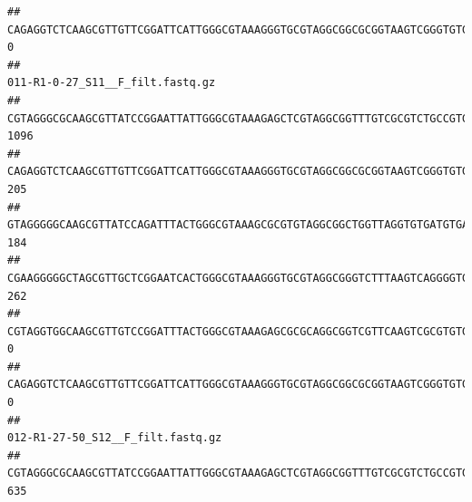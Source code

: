 \documentclass[]{article}
\begin{document}
\begin{verbatim}
## CAGAGGTCTCAAGCGTTGTTCGGATTCATTGGGCGTAAAGGGTGCGTAGGCGGCGCGGTAAGTCGGGTGTGAAATCTCGGGGCTTAACTCCGAAACTGCATTCGATACTGCCGTGCTTGAGGACTGGAGAGGAGACTGGAATTTACGGTGTAGCGGTGAAATGCGTAGATATCGTAAGGAAGACCAGTGGCGAAGGCGGGTCTCTGGACAGTTCCTGACGCTGAGGCACGAAGGCCAGGGGAGCAAACG                                 0
##                                                                                                                                                                                                                                                           011-R1-0-27_S11__F_filt.fastq.gz
## CGTAGGGCGCAAGCGTTATCCGGAATTATTGGGCGTAAAGAGCTCGTAGGCGGTTTGTCGCGTCTGCCGTGAAAGTCCGGGGCTCAACTCCGGATCTGCGGTGGGTACGGGCAGACTAGAGTGATGTAGGGGAGACTGGAATTCCTGGTGTAGCGGTGAAATGCGCAGATATCAGGAGGAACACCGATGGCGAAGGCAGGTCTCTGGGCATTAACTGACGCTGAGGAGCGAAAGCATGGGGAGCGAACA                             1096
## CAGAGGTCTCAAGCGTTGTTCGGATTCATTGGGCGTAAAGGGTGCGTAGGCGGCGCGGTAAGTCGGGTGTGAAATCTCGGAGCTTAACTCCGAAACTGCATTCGATACTGCCGTGCTTGAGGACTGGAGAGGAGACTGGAATTTACGGTGTAGCGGTGAAATGCGTAGATATCGTAAGGAAGACCAGTGGCGAAGGCGGGTCTCTGGACAGTTCCTGACGCTGAGGCACGAAGGCCAGGGGAGCAAACG                              205
## GTAGGGGGCAAGCGTTATCCAGATTTACTGGGCGTAAAGCGCGTGTAGGCGGCTGGTTAGGTGTGATGTGAAATCTTCCGGCTCAACCGGAAAACTGCATTGCAAACCGGCCTGGCTAGAGTGCAGGAGAGGGAAGCGGAATTCCAGGTGTAGCGGTGAAATGCGTAGATATCTGGAGGAACACCAGTGGCGAAGGCGGCTTCCTGGCCTGCAACTGACGCTGAGACGCGAAAGCGTGGGGAGCGAAC                               184
## CGAAGGGGGCTAGCGTTGCTCGGAATCACTGGGCGTAAAGGGTGCGTAGGCGGGTCTTTAAGTCAGGGGTGAAATCCTGGAGCTCAACTCCAGAACTGCCTTTGATACTGAAGATCTTGAGTTCGGGAGAGGTGAGTGGAACTGCGAGTGTAGAGGTGAAATTCGTAGATATTCGCAAGAACACCAGTGGCGAAGGCGGCTCACTGGCCCGATACTGACGCTGAGGCACGAAAGCGTGGGGAGCAAACA                              262
## CGTAGGTGGCAAGCGTTGTCCGGATTTACTGGGCGTAAAGAGCGCGCAGGCGGTCGTTCAAGTCGCGTGTGAAAGCCCCCGGCTCAACTGGGGAGGGTCACGCGATACTGATCGACTCGAAGGCAGGAGAGGGTAGTGGAATTCCCGGTGTAGTGGTGAAATGCGTAGATATCGGGAGGAACACCAGTGGCGAAGGCGACTACCTGGCCTGTTCTTGACGCTGAGGCGCGAAAGCTAGGGGAGCAAACG                                0
## CAGAGGTCTCAAGCGTTGTTCGGATTCATTGGGCGTAAAGGGTGCGTAGGCGGCGCGGTAAGTCGGGTGTGAAATCTCGGGGCTTAACTCCGAAACTGCATTCGATACTGCCGTGCTTGAGGACTGGAGAGGAGACTGGAATTTACGGTGTAGCGGTGAAATGCGTAGATATCGTAAGGAAGACCAGTGGCGAAGGCGGGTCTCTGGACAGTTCCTGACGCTGAGGCACGAAGGCCAGGGGAGCAAACG                                0
##                                                                                                                                                                                                                                                           012-R1-27-50_S12__F_filt.fastq.gz
## CGTAGGGCGCAAGCGTTATCCGGAATTATTGGGCGTAAAGAGCTCGTAGGCGGTTTGTCGCGTCTGCCGTGAAAGTCCGGGGCTCAACTCCGGATCTGCGGTGGGTACGGGCAGACTAGAGTGATGTAGGGGAGACTGGAATTCCTGGTGTAGCGGTGAAATGCGCAGATATCAGGAGGAACACCGATGGCGAAGGCAGGTCTCTGGGCATTAACTGACGCTGAGGAGCGAAAGCATGGGGAGCGAACA                               635

\end{verbatim}
\end{document}
